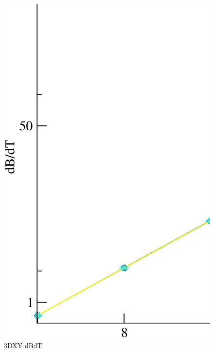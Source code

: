 \begin{figure}[!htpb]
  \centering
  \includegraphics[width=\textwidth]{./plots/3DXY/vsL/dBdT.eps}
  \caption{3DXY dBdT}
\end{figure}

